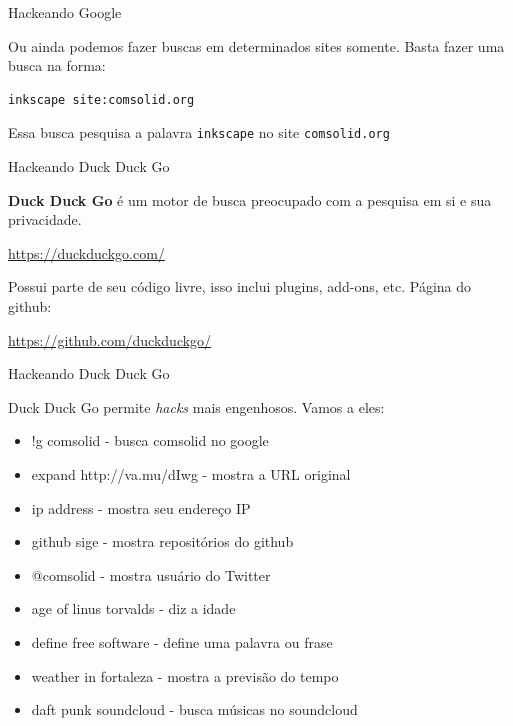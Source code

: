 \begin{frame}[fragile]{Hackeando Google}

Ou ainda podemos fazer buscas em determinados sites somente. Basta fazer
uma busca na forma:

\begin{verbatim}
inkscape site:comsolid.org
\end{verbatim}

Essa busca pesquisa a palavra \texttt{inkscape} no site
\texttt{comsolid.org}

\end{frame}

\begin{frame}{Hackeando Duck Duck Go}

\textbf{Duck Duck Go} é um motor de busca preocupado com a pesquisa em
si e sua privacidade.

\url{https://duckduckgo.com/}

Possui parte de seu código livre, isso inclui plugins, add-ons, etc.
Página do github:

\url{https://github.com/duckduckgo/}

\end{frame}

\begin{frame}{Hackeando Duck Duck Go}

Duck Duck Go permite \emph{hacks} mais engenhosos. Vamos a eles:

\begin{itemize}
\itemsep1pt\parskip0pt
\item
  !g comsolid - busca comsolid no google
\item
  expand http://va.mu/dIwg - mostra a URL original
\item
  ip address - mostra seu endereço IP
\item
  github sige - mostra repositórios do github
\item
  @comsolid - mostra usuário do Twitter
\item
  age of linus torvalds - diz a idade
\item
  define free software - define uma palavra ou frase
\item
  weather in fortaleza - mostra a previsão do tempo
\item
  daft punk soundcloud - busca músicas no soundcloud
\end{itemize}

\end{frame}

